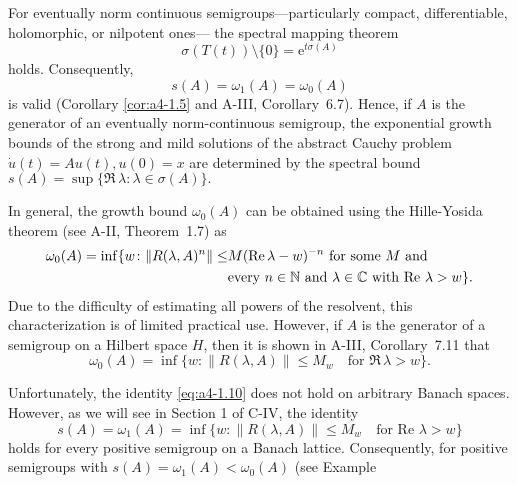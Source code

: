 \begin{remark}\label{rem:a4-1.7}
For eventually norm continuous semigroups---particularly compact, differentiable, holomorphic, or nilpotent ones--- the spectral mapping theorem 
\begin{equation}\label{eq:a4-1.7}
\sigma(T(t)) \setminus \{0\} = \mathrm{e}^{t \sigma(A)}
\end{equation}
holds. 
Consequently,
\begin{equation}\label{eq:a4-1.8}
s(A) = \omega_1(A) = \omega_{0}(A)
\end{equation}
is valid (Corollary \ref{cor:a4-1.5} and A-III, Corollary~6.7).
Hence, if $A$ is the generator of an eventually norm-continuous semigroup, the exponential growth bounds of the strong and mild solutions of the abstract Cauchy problem $\dot{u}(t) = A u(t), u(0) = x$ are determined by the spectral bound
$s(A) = \sup\{\Re\,\lambda\colon\lambda \in \sigma(A)\}.$
\end{remark}
\begin{remark} In general, the growth bound $\omega_{0}(A)$ can be obtained using the Hille-Yosida theorem (see A-II, Theorem~1.7) as
\begin{align}\label{eq:a4-1.9}
\omega_{0}(A) = \inf \{ w\colon\|R(\lambda, A)^n\| \leq &M ( \mathop{}\!\mathrm{Re}\,\lambda - w)^{-n} \text{ for some } M \text{ and}\\
&\text{every } n \in \mathbb{N} \text{ and } \lambda \in \mathbb{C} \text{ with } \text{Re } \lambda > w\}.\notag
\end{align}
Due to the difficulty of estimating all powers of the resolvent, this characterization is of limited practical use. 
However, if $A$ is the generator of a semigroup on a Hilbert space $H$, then it is shown in A-III, Corollary~7.11 that
\begin{equation}\label{eq:a4-1.10}
 \omega_{0}(A) = \inf \{ w\colon\| R(\lambda, A) \| \leq M_w \quad \text{for } \Re\,\lambda > w \}.
\end{equation}
\end{remark}
Unfortunately, the identity \eqref{eq:a4-1.10} does not hold on arbitrary Banach spaces. 
However, as we will see in Section 1 of C-IV, the identity 
\begin{equation}\label{eq:a4-1.11}
 s(A)=\omega_1(A) = \inf \{ w\colon\| R(\lambda, A) \| \leq M_w \quad \text{for } \text{Re } \lambda > w \}
\end{equation}
holds for every positive semigroup on a Banach lattice. 
Consequently, for positive semigroups with $s(A) = \omega_1(A) < \omega_{0}(A)$ (see Example 
